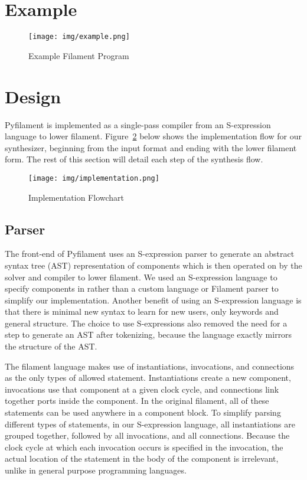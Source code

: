 \documentclass[12pt,a4paper]{article}
\begin{document}
\section{Example}
\begin{figure}[htbp]
    \centering
    \texttt{[image: img/example.png]}
    \caption{Example Filament Program}
    \label{fig:ex}
\end{figure}

\section{Design}
Pyfilament is implemented as a single-pass compiler from an S-expression language to lower filament. Figure~\ref{fig:imp} below shows the implementation flow for our synthesizer, beginning from the input format and ending with the lower filament form. The rest of this section will detail each step of the synthesis flow.

\begin{figure}[htbp]
    \centering
    \texttt{[image: img/implementation.png]}
    \caption{Implementation Flowchart}
    \label{fig:imp}
\end{figure}

\subsection{Parser}
The front-end of Pyfilament uses an S-expression parser to generate an abstract syntax tree (AST) representation of components which is then operated on by the solver and compiler to lower filament. We used an S-expression language to specify components in rather than a custom language or Filament parser to simplify our implementation. Another benefit of using an S-expression language is that there is minimal new syntax to learn for new users, only keywords and general structure. The choice to use S-expressions also removed the need for a step to generate an AST after tokenizing, because the language exactly mirrors the structure of the AST.

The filament language makes use of instantiations, invocations, and connections as the only types of allowed statement. Instantiations create a new component, invocations use that component at a given clock cycle, and connections link together ports inside the component. In the original filament, all of these statements can be used anywhere in a component block. To simplify parsing different types of statements, in our S-expression language, all instantiations are grouped together, followed by all invocations, and all connections. Because the clock cycle at which each invocation occurs is specified in the invocation, the actual location of the statement in the body of the component is irrelevant, unlike in general purpose programming languages.
\end{document}
